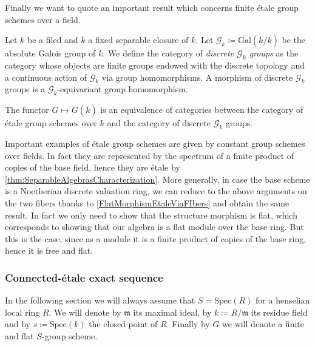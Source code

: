 \noindent
Finally we want to quote an important result which
concerns finite étale group schemes over a field.
\begin{defn}
	Let $k$ be a filed and $\overline{k}$ a fixed separable closure of $k$.
	Let $\mathscr{G}_k \coloneqq \mathrm{Gal}\left( \overline{k} / k \right)$ be the
	absolute Galois group of $k$.
	We define the category of {\em discrete $\mathscr{G}_k$ groups} as the category
	whose objects are finite groups endowed with the discrete topology and
	a continuous action of $\mathscr{G}_k$ via group homomorphisms.
	A morphism of discrete $\mathscr{G}_k$ groups is a $\mathscr{G}_k$-equivariant
	group homomorphism.
\end{defn}


\begin{thm}\label{CharacterizationEtaleGroupSchemesK}
	The functor $G \mapsto G(\overline{k})$ is an equivalence of categories
	between the category of étale group schemes over $k$ and the
	category of discrete $\mathscr{G}_k$ groups.
\end{thm}


\begin{ex}[]\label{EtaleConstantGroupScheme}
	Important examples of étale group schemes are given by
	constant group schemes over fields.
	In fact they are represented by the spectrum of a
	finite product of copies of the base field, hence they are étale
	by \cref{thm:SeparableAlgebrasCharacterization}.
	More generally, in case the base scheme is a Noetherian discrete valuation
	ring, we can reduce to the above arguments on the two fibers 
	thanks to \cref{FlatMorphismEtaleViaFIbers} and obtain the same result.
	In fact we only need to show that the structure morphism is flat,
	which corresponds to showing that our algebra is a flat module over the 
	base ring.
	But this is the case, since as a module it is a finite product of copies
	of the base ring, hence it is free and flat.
\end{ex}



\subsubsection{Connected-étale exact sequence}
In the following section we will always assume that 
$S = \mathrm{Spec}(R)$	for a henselian local ring $R$.
We will denote by $\mathfrak{m}$ its maximal ideal, by $k \coloneqq R/\mathfrak{m}$
its residue field and by $s \coloneqq \mathrm{Spec}(k)$ the closed point of $R$.
Finally by $G$ we will denote a finite and flat $S$-group scheme.

